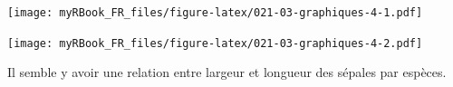 \documentclass[twoside,symmetric]{book}
\newenvironment{Shaded}{}{}
\newcommand{\CommentTok}[1]{\textit{#1}}
\newcommand{\DataTypeTok}[1]{\underline{#1}}
\newcommand{\DecValTok}[1]{#1}
\newcommand{\FloatTok}[1]{#1}
\newcommand{\KeywordTok}[1]{\textbf{#1}}
\newcommand{\NormalTok}[1]{#1}
\newcommand{\OperatorTok}[1]{#1}
\newcommand{\StringTok}[1]{#1}
\begin{document}
\texttt{[image: myRBook\_FR\_files/figure-latex/021-03-graphiques-4-1.pdf]}

\begin{Shaded}
\end{Shaded}

\texttt{[image: myRBook\_FR\_files/figure-latex/021-03-graphiques-4-2.pdf]}

Il semble y avoir une relation entre largeur et longueur des sépales par espèces.
\end{document}
